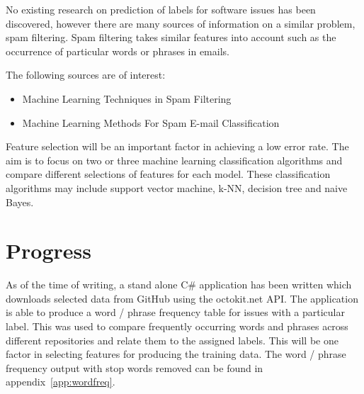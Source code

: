 \documentclass{article}
\begin{document}
\begin{multicols}{2}
No existing research on prediction of labels for software issues has been discovered, however there are many sources of information on a similar problem, spam filtering. Spam filtering takes similar features into account such as the occurrence of particular words or phrases in emails.

The following sources are of interest:
\begin{itemize}
\item Machine Learning Techniques in Spam Filtering 
\item Machine Learning Methods For Spam E-mail Classification 
\end{itemize}

Feature selection will be an important factor in achieving a low error rate. The aim is to focus on two or three machine learning classification algorithms and compare different selections of features for each model. These classification algorithms may include support vector machine, k-NN, decision tree and naive Bayes.

\section*{Progress}
As of the time of writing, a stand alone C\# application has been written which downloads selected data from GitHub using the octokit.net API. The application is able to produce a word / phrase frequency table for issues with a particular label. This was used to compare frequently occurring words and phrases across different repositories and relate them to the assigned labels. This will be one factor in selecting features for producing the training data. The word / phrase frequency output with stop words removed can be found in appendix~\ref{app:wordfreq}.

\printbibliography

\end{multicols}

\newpage
\end{document}
